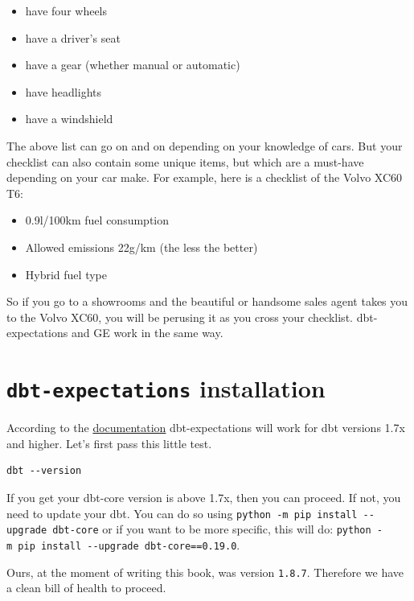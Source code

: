\documentclass[
]{book}
\providecommand{\tightlist}{%
  \setlength{\itemsep}{0pt}\setlength{\parskip}{0pt}}
\begin{document}
\begin{itemize}
\tightlist
\item
  have four wheels
\item
  have a driver's seat
\item
  have a gear (whether manual or automatic)
\item
  have headlights
\item
  have a windshield
\end{itemize}

The above list can go on and on depending on your knowledge of cars. But your checklist can also contain some unique items, but which are a must-have depending on your car make. For example, here is a checklist of the Volvo XC60 T6:

\begin{itemize}
\tightlist
\item
  0.9l/100km fuel consumption
\item
  Allowed emissions 22g/km (the less the better)
\item
  Hybrid fuel type
\end{itemize}

So if you go to a showrooms and the beautiful or handsome sales agent takes you to the Volvo XC60, you will be perusing it as you cross your checklist. dbt-expectations and GE work in the same way.

\hypertarget{dbt-expectations-installation}{%
\section{\texorpdfstring{\texttt{dbt-expectations} installation}{dbt-expectations installation}}\label{dbt-expectations-installation}}

According to the \href{https://hub.getdbt.com/calogica/dbt_expectations/latest/}{documentation} dbt-expectations will work for dbt versions 1.7x and higher. Let's first pass this little test.

\begin{verbatim}
dbt --version
\end{verbatim}

If you get your dbt-core version is above 1.7x, then you can proceed. If not, you need to update your dbt. You can do so using \texttt{python\ -m\ pip\ install\ -\/-upgrade\ dbt-core} or if you want to be more specific, this will do: \texttt{python\ -m\ pip\ install\ -\/-upgrade\ dbt-core==0.19.0}.

Ours, at the moment of writing this book, was version \texttt{1.8.7}. Therefore we have a clean bill of health to proceed.
\end{document}
